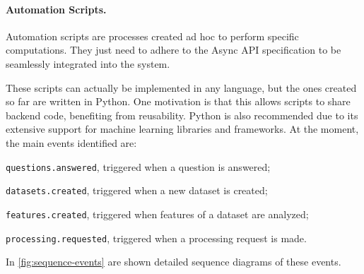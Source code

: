 \documentclass[12pt,a4paper,openright,twoside]{book}
\begin{document}
\paragraph{Automation Scripts.}

Automation scripts are processes created ad hoc to perform specific computations.
%
They just need to adhere to the Async API specification to be seamlessly integrated into the system.
%

These scripts can actually be implemented in any language, but the ones created so far are written in Python.
%
One motivation is that this allows scripts to share backend code, benefiting from reusability.
%
Python is also recommended due to its extensive support for machine learning libraries and frameworks.
%
At the moment, the main events identified are:
\begin{enumerate*}[label=(\roman*)]
    \item \texttt{questions.answered}, triggered when a question is answered;
    \item \texttt{datasets.created}, triggered when a new dataset is created;
    \item \texttt{features.created}, triggered when features of a dataset are analyzed;
    \item \texttt{processing.requested}, triggered when a processing request is made.
\end{enumerate*}

In \cref{fig:sequence-events} are shown detailed sequence diagrams of these events. 

\end{document}

